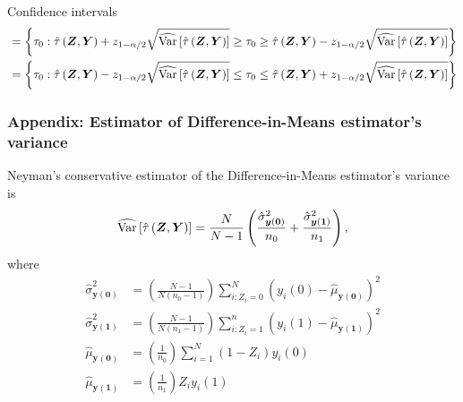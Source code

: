 \documentclass[table, xcolor = {dvipsnames}, 9pt]{beamer}
\theoremstyle{plain}
\DeclareMathOperator{\Var}{\rm{Var}}
\begin{document}
\begin{frame}{Confidence intervals}
\begin{equation*}
\begin{split}
& = \left\{\tau_0 : \hat{\tau}\left(\bm{Z}, \bm{Y}\right)+ z_{1 - \alpha/2} \sqrt{\widehat{\Var}\left[\hat{\tau}\left(\bm{Z}, \bm{Y}\right)\right] }\geq \tau_0 \geq  \hat{\tau}\left(\bm{Z}, \bm{Y}\right)- z_{1 - \alpha/2} \sqrt{\widehat{\Var}\left[\hat{\tau}\left(\bm{Z}, \bm{Y}\right)\right] }\right\} \\
& = \left\{\tau_0 : \hat{\tau}\left(\bm{Z}, \bm{Y}\right)- z_{1 - \alpha/2} \sqrt{\widehat{\Var}\left[\hat{\tau}\left(\bm{Z}, \bm{Y}\right)\right] }\leq \tau_0 \leq \hat{\tau}\left(\bm{Z}, \bm{Y}\right)+ z_{1 - \alpha/2} \sqrt{\widehat{\Var}\left[\hat{\tau}\left(\bm{Z}, \bm{Y}\right)\right] }\right\}
\end{split}
\end{equation*}
\normalsize
\end{frame}


\begin{frame}[t, label = Variance estimators]
\frametitle{Appendix: Estimator of Difference-in-Means estimator's variance}
\vfill
Neyman's conservative estimator of the Difference-in-Means estimator's variance is
\begin{equation*}
\widehat{\Var}\left[\hat{\tau}\left(\bm{Z}, \bm{Y}\right)\right] = \frac{N}{N - 1}\left(\frac{\hat{\sigma}^2_{\bm{y}(\bm{0})}}{n_0} + \frac{\hat{\sigma}^2_{\bm{y}(\bm{1})}}{n_1} \right),
\end{equation*}
where
\begin{align*}
\hat{\sigma}^2_{\bm{y}(\bm{0})} & = \left(\frac{N - 1}{N\left(n_0 - 1\right)}\right)\sum \limits_{i: Z_i = 0}^N \left(y_i(0) - \hat{\mu}_{\bm{y}(\bm{0})}\right)^2 \\
\hat{\sigma}^2_{\bm{y}(\bm{1})} & = \left(\frac{N - 1}{N\left(n_1 - 1\right)}\right)\sum \limits_{i: Z_i = 1}^{n} \left(y_i(1) - \hat{\mu}_{\bm{y}(\bm{1})}\right)^2 \\
\hat{\mu}_{\bm{y}(\bm{0})} & = \left(\frac{1}{n_0}\right) \sum \limits_{i = 1}^N \left(1 - Z_i\right)y_i(0) \\
\hat{\mu}_{\bm{y}(\bm{1})} & = \left(\frac{1}{n_1}\right) Z_i y_i(1)
\end{align*}
\vfill
\end{frame}
\end{document}
